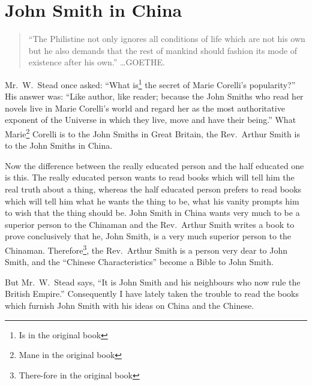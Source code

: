 \chapter{John Smith in China}
{\begin{quote} \footnotesize ``The Philistine not only ignores all conditions of life which are not his own but he also demands that the rest of mankind should fashion its mode of existence after his own.'' \hfill \dots GOETHE\cite{num24}. \end{quote}}
\vspace{0.3cm}

Mr.~W.~Stead  once asked: ``What is\footnote{Is in the original book} the secret of Marie Corelli's  popularity?'' His answer was: ``Like author, like reader; because the John Smiths who read her novels live in Marie Corelli's world and regard her as the most authoritative exponent of the Universe in which they live, move and have their being.''
What Marie\footnote{Mane in the original book} Corelli is to the John Smiths in Great Britain, the Rev.~Arthur Smith  is to the John Smiths in China.

Now the difference between the really educated person and the half educated one is this.
The really educated person wants to read books which will tell him the real truth about a thing, whereas the half educated person prefers to read books which will tell him what he wants the thing to be, what his vanity prompts him to wish that the thing should be.
John Smith in China wants very much to be a superior person to the Chinaman and the Rev.~Arthur Smith writes a book to prove conclusively that he, John Smith, is a very much superior person to the Chinaman.
Therefore\footnote{There-fore in the original book}, the Rev.~Arthur Smith is a person very dear to John Smith, and the ``Chinese Characteristics'' become a Bible to John Smith.

But Mr.~W.~Stead says, ``It is John Smith and his neighbours who now rule the British Empire.''
Consequently I have lately taken the trouble to read the books which furnish John Smith with his ideas on China and the Chinese.

